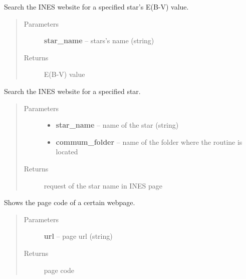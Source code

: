 \documentclass[letterpaper,10pt,english]{sphinxmanual}
\begin{document}
\begin{fulllineitems}
\label{index:BeFaVOr_web.retrieve_ebmv_value}
Search the INES website for a specified star's E(B-V) value.
\begin{quote}\begin{description}
\item[{Parameters}] \leavevmode
\textbf{star\_name} -- stars's name (string)

\item[{Returns}] \leavevmode
E(B-V) value

\end{description}\end{quote}

\end{fulllineitems}


\begin{fulllineitems}
\label{index:BeFaVOr_web.selecting_data}
Search the INES website for a specified star.
\begin{quote}\begin{description}
\item[{Parameters}] \leavevmode\begin{itemize}
\item {} 
\textbf{star\_name} -- name of the star (string)

\item {} 
\textbf{commum\_folder} -- name of the folder where the routine is located

\end{itemize}

\item[{Returns}] \leavevmode
request of the star name in INES page

\end{description}\end{quote}

\end{fulllineitems}


\begin{fulllineitems}
\label{index:BeFaVOr_web.show_page_code}
Shows the page code of a certain webpage.
\begin{quote}\begin{description}
\item[{Parameters}] \leavevmode
\textbf{url} -- page url (string)

\item[{Returns}] \leavevmode
page code

\end{description}\end{quote}

\end{fulllineitems}
\end{document}
